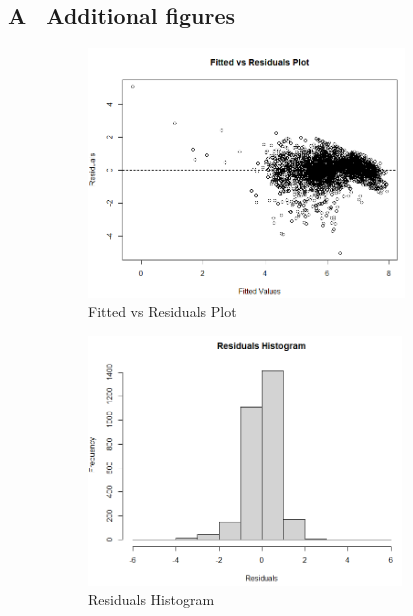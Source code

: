 \documentclass[12 pt]{scrartcl}
\begin{document}
\newpage
{}
\renewcommand\refname{Bibliography} 



\newpage
\appendix 
{}
\subsection*{A \ Additional figures}


\begin{figure}[ht]
\begin{subfigure}{.5\textwidth}
  \centering
  \includegraphics[height=2.6in,width=1\linewidth]{Fitted vs Residuals Plot.png}  
  \caption{Fitted vs Residuals Plot}
  \label{fig:sub-first}
\end{subfigure}
\begin{subfigure}{.5\textwidth}
  \centering
  \includegraphics[height=2.6in,width=1\linewidth]{Residuals Histogram.png}  
  \caption{Residuals Histogram}
  \label{fig:sub-first}
\end{subfigure}
\begin{subfigure}{.5\textwidth}

\end{subfigure}
\end{figure}
\end{document}
